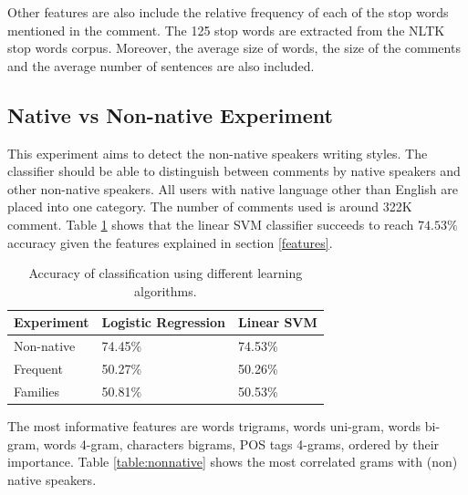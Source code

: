 \documentclass[10pt,a5paper,twoside]{article}
\begin{document}
Other features are also include the relative frequency of each of the stop words
mentioned in the comment. The 125 stop words are extracted from the NLTK stop
words corpus\cite{nltk}. Moreover, the average size of words, the size of the
comments and the average number of sentences are also included.

\subsection{Native vs Non-native Experiment}
\label{exps}
This experiment aims to detect the non-native speakers writing styles. The
classifier should be able to distinguish between comments by native speakers
and other non-native speakers.
All users with native language other than English are placed into one category.
The number of comments used is around 322K comment. Table
\ref{table:results} shows that the linear SVM classifier succeeds to reach
$74.53\%$ accuracy given the features explained in section \ref{features}.
\begin{table}
  \begin{center}
  \begin{tabular}{l|ll}
	Experiment & Logistic Regression & Linear SVM
	\\\hline
	Non-native & 74.45\% & 74.53\%\\
	Frequent & 50.27\% & 50.26\%\\
	Families & 50.81\% &50.53\% \\
\end{tabular}
\caption{Accuracy of classification using different learning algorithms.}
\label{table:results}
\end{center}
\end{table}

The most informative features are words trigrams, words uni-gram, words bi-gram,
words 4-gram, characters bigrams, POS tags 4-grams, ordered by their importance.
Table \ref{table:nonnative} shows the most correlated grams with (non) native
speakers.
\end{document}
